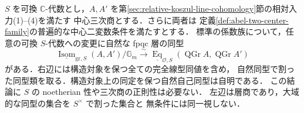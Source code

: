\begin{theorem}
\label{thm:general-relative-pointed-hom}
$S$ を可換 $\mathbb C$-代数とし，$A,A'$ を第\ref{sec:relative-koszul-line-cohomology}節の相対入力\textup{(1)--(4)}を満たす
中心三次商とする．さらに両者は
定義\ref{def:abel-two-center-family}の普遍的な中心二変数条件を満たすとする．
標準の係数族について，任意の可換 $S$-代数への変更に自然な fpqc 層の同型
\begin{equation}\label{eq:general-relative-pointed-hom}
 \underline{\operatorname{Isom}}_{\mathrm{gr},S}(A,A')/\mathbb G_m
 \xrightarrow{\sim}
 \underline{\operatorname{Eq}}_{\mathcal O,S}
       (\operatorname{QGr}A,\operatorname{QGr}A')
\end{equation}
がある．右辺には構造対象を保つ全ての完全線型同値を含め，
自然同型で割った同型類を取る．構造対象上の同定を保つ自然自己同型は自明である．
この結論に $S$ の noetherian 性や三次商の正則性は必要ない．
左辺は層商であり，大域的な同型の集合を $S^\times$ で割った集合と
無条件には同一視しない．
\end{theorem}

